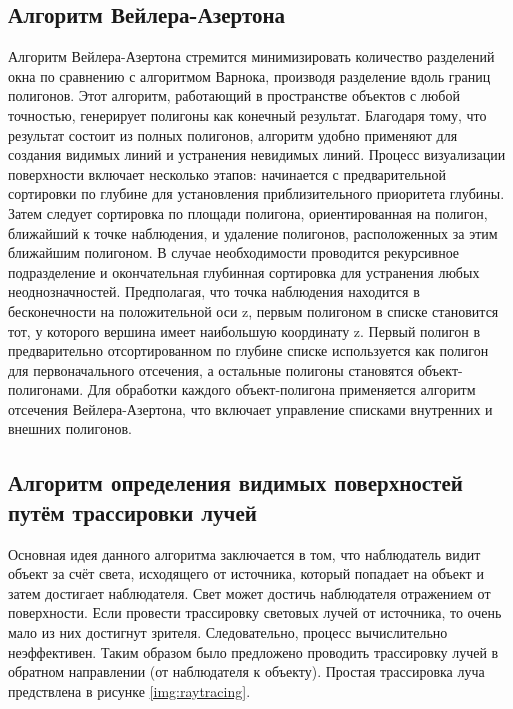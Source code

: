 \subsection{Алгоритм Вейлера-Азертона}
Алгоритм Вейлера-Азертона \cite{math_cg} стремится минимизировать количество разделений окна по сравнению с алгоритмом Варнока, производя разделение вдоль границ полигонов. Этот алгоритм, работающий в пространстве объектов с любой точностью, генерирует полигоны как конечный результат. Благодаря тому, что результат состоит из полных полигонов, алгоритм удобно применяют для создания видимых линий и устранения невидимых линий. Процесс визуализации поверхности включает несколько этапов: начинается с предварительной сортировки по глубине для установления приблизительного приоритета глубины. Затем следует сортировка по площади полигона, ориентированная на полигон, ближайший к точке наблюдения, и удаление полигонов, расположенных за этим ближайшим полигоном. В случае необходимости проводится рекурсивное подразделение и окончательная глубинная сортировка для устранения любых неоднозначностей. Предполагая, что точка наблюдения находится в бесконечности на положительной оси z, первым полигоном в списке становится тот, у которого вершина имеет наибольшую координату z. Первый полигон в предварительно отсортированном по глубине списке используется как полигон для первоначального отсечения, а остальные полигоны становятся объект-полигонами. Для обработки каждого объект-полигона применяется алгоритм отсечения Вейлера-Азертона, что включает управление списками внутренних и внешних полигонов.


\subsection{Алгоритм определения видимых поверхностей путём трассировки лучей}
Основная идея данного алгоритма заключается в том, что наблюдатель видит объект за счёт света, исходящего от источника, который попадает на объект и затем достигает наблюдателя. Свет может достичь наблюдателя отражением от поверхности. Если провести трассировку световых лучей от источника, то очень мало из них достигнут зрителя. Следовательно, процесс вычислительно неэффективен. Таким образом было предложено проводить трассировку лучей в обратном направлении (от наблюдателя к объекту). Простая трассировка луча предствлена в рисунке \ref{img:raytracing}.

